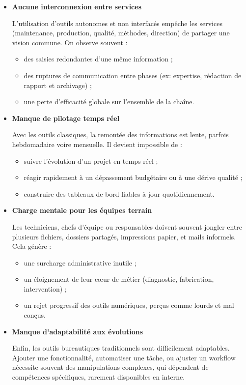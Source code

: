 \documentclass[11pt,a4paper]{article}
\begin{document}
\begin{itemize}
\item \textbf{Aucune interconnexion entre services}

L’utilisation d’outils autonomes et non interfacés empêche les services (maintenance, production, qualité, méthodes, direction) de partager une vision commune. On observe souvent :

\begin{itemize}
    \item des saisies redondantes d’une même information ;
    \item des ruptures de communication entre phases (ex: expertise, rédaction de rapport et archivage) ;
    \item une perte d’efficacité globale sur l’ensemble de la chaîne.
\end{itemize}

\item \textbf{Manque de pilotage temps réel}

Avec les outils classiques, la remontée des informations est lente, parfois hebdomadaire voire mensuelle. Il devient impossible de :

\begin{itemize}
    \item suivre l’évolution d’un projet en temps réel ;
    \item réagir rapidement à un dépassement budgétaire ou à une dérive qualité ;
    \item construire des tableaux de bord fiables à jour quotidiennement.
\end{itemize}

\item \textbf{Charge mentale pour les équipes terrain}

Les techniciens, chefs d’équipe ou responsables doivent souvent jongler entre plusieurs fichiers, dossiers partagés, impressions papier, et mails informels. Cela génère :

\begin{itemize}
    \item une surcharge administrative inutile ;
    \item un éloignement de leur cœur de métier (diagnostic, fabrication, intervention) ;
    \item un rejet progressif des outils numériques, perçus comme lourds et mal conçus.
\end{itemize}

\item \textbf{Manque d’adaptabilité aux évolutions}

Enfin, les outils bureautiques traditionnels sont difficilement adaptables. Ajouter une fonctionnalité, automatiser une tâche, ou ajuster un workflow nécessite souvent des manipulations complexes, qui dépendent de compétences spécifiques, rarement disponibles en interne.

\end{itemize}
\end{document}
